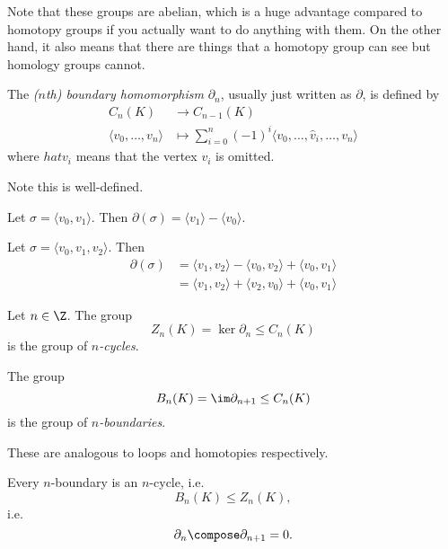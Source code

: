 \documentclass[a4paper]{article}
\renewcommand{\b}{\partial} %
\begin{document}
\begin{remark}
  Note that these groups are abelian, which is a huge advantage compared to homotopy groups if you actually want to do anything with them. On the other hand, it also means that there are things that a homotopy group can see but homology groups cannot.
\end{remark}

\begin{definition}
  The \emph{(\(n\)th) boundary homomorphism} \(\b_n\), usually just written as \(\b\), is defined by
  \begin{align*}
    C_n(K) &\to C_{n - 1}(K) \\
    \langle v_0, \dots, v_n \rangle &\mapsto \sum_{i = 0}^n (-1)^i \langle v_0, \dots, \hat v_i, \dots, v_n \rangle
  \end{align*}
  where \(hat v_i\) means that the vertex \(v_i\) is omitted.
\end{definition}

Note this is well-defined.

\begin{eg}
  Let \(\sigma = \langle v_0, v_1 \rangle\). Then \(\b(\sigma) = \langle v_1 \rangle - \langle v_0 \rangle\).
\end{eg}

\begin{eg}
  Let \(\sigma = \langle v_0, v_1, v_2 \rangle\). Then
  \begin{align*}
    \b(\sigma)
    &= \langle v_1, v_2 \rangle - \langle v_0, v_2 \rangle + \langle v_0, v_1 \rangle \\
    &= \langle v_1, v_2 \rangle + \langle v_2, v_0 \rangle + \langle v_0, v_1 \rangle
  \end{align*}
\end{eg}

\begin{definition}
  Let \(n \in \Z\). The group
  \[
    Z_n(K) = \ker \b_n \leq C_n(K)
  \]
  is the group of \emph{\(n\)-cycles}.

  The group
  \[
    B_n(K) = \im \b_{n + 1} \leq C_n(K)
  \]
  is the group of \emph{\(n\)-boundaries}.
\end{definition}

These are analogous to loops and homotopies respectively.

\begin{lemma}
  Every \(n\)-boundary is an \(n\)-cycle, i.e.
  \[
    B_n(K) \leq Z_n(K),
  \]
  i.e.
  \[
    \b_n \compose \b_{n + 1} = 0.
  \]
\end{lemma}
\end{document}
